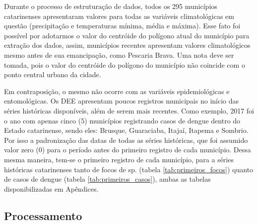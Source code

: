 \documentclass[
	12pt,				%
	openright,			%
	oneside,			%
	a4paper,			%
	english,			%
	french,				%
	spanish,			%
	brazil				%
	dvipsnames, table]{abntex2}
\begin{document}
\indent Durante o processo de estruturação de dados, todos os 295 municípios catarinenses apresentaram valores para todas as variáveis climatológicas em questão (precipitação e temperaturas mínima, média e máxima). Esse fato foi possível por adotarmos o valor do centróide do polígono atual do município para extração dos dados, assim, municípios recentes apresentam valores climatológicos mesmo antes de sua emancipação, como Pescaria Brava. Uma nota deve ser tomada, pois o valor do centróide do polígono do município não coincide com o ponto central urbano da cidade.

\indent Em contraposição, o mesmo não ocorre com as variáveis epidemiológicas e entomológicas. Os \acrshort{DEE} apresentam poucos registros municipais no início das séries históricas disponíveis, além de serem mais recentes. Como exemplo, 2017 foi o ano com apenas cinco (5) municípios registrando casos de dengue dentro do Estado catarinense, sendo eles: Brusque, Guaraciaba, Itajaí, Itapema e Sombrio. Por isso a padronização das datas de todas as séries históricas, que foi assumido valor zero (0) para o período antes do primeiro registro de cada município. Dessa mesma maneira, tem-se o primeiro registro de cada município, para a séries históricas catarinenses tanto de focos de  sp. (tabela \ref{tab:primeiros_focos}) quanto de casos de dengue (tabela \ref{tab:primeiros_casos}), ambas as tabelas disponibilizadas em Apêndices.





\subsection{Processamento}
\end{document}

